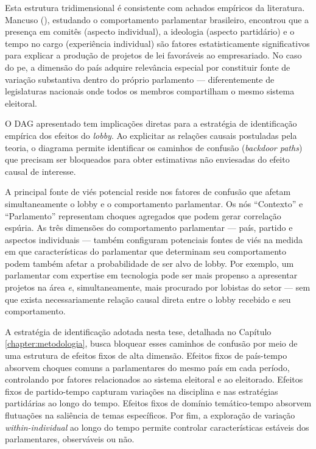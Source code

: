 Esta estrutura tridimensional é consistente com achados empíricos da literatura. Mancuso (\citeyear{mancuso2023business}), estudando o comportamento parlamentar brasileiro, encontrou que a presença em comitês (aspecto individual), a ideologia (aspecto partidário) e o tempo no cargo (experiência individual) são fatores estatisticamente significativos para explicar a produção de projetos de lei favoráveis ao empresariado. No caso do \acrshort{pe}, a dimensão do país adquire relevância especial por constituir fonte de variação substantiva dentro do próprio parlamento — diferentemente de legislaturas nacionais onde todos os membros compartilham o mesmo sistema eleitoral.

O DAG apresentado tem implicações diretas para a estratégia de identificação empírica dos efeitos do \textit{lobby}. Ao explicitar as relações causais postuladas pela teoria, o diagrama permite identificar os caminhos de confusão (\textit{backdoor paths}) que precisam ser bloqueados para obter estimativas não enviesadas do efeito causal de interesse.

A principal fonte de viés potencial reside nos fatores de confusão que afetam simultaneamente o lobby e o comportamento parlamentar. Os nós ``Contexto'' e ``Parlamento'' representam choques agregados que podem gerar correlação espúria. As três dimensões do comportamento parlamentar — país, partido e aspectos individuais — também configuram potenciais fontes de viés na medida em que características do parlamentar que determinam seu comportamento podem também afetar a probabilidade de ser alvo de lobby. Por exemplo, um parlamentar com expertise em tecnologia pode ser mais propenso a apresentar projetos na área \textit{e}, simultaneamente, mais procurado por lobistas do setor — sem que exista necessariamente relação causal direta entre o lobby recebido e seu comportamento.

A estratégia de identificação adotada nesta tese, detalhada no Capítulo \ref{chapter:metodologia}, busca bloquear esses caminhos de confusão por meio de uma estrutura de efeitos fixos de alta dimensão. Efeitos fixos de país-tempo absorvem choques comuns a parlamentares do mesmo país em cada período, controlando por fatores relacionados ao sistema eleitoral e ao eleitorado. Efeitos fixos de partido-tempo capturam variações na disciplina e nas estratégias partidárias ao longo do tempo. Efeitos fixos de domínio temático-tempo absorvem flutuações na saliência de temas específicos. Por fim, a exploração de variação \textit{within-individual} ao longo do tempo permite controlar características estáveis dos parlamentares, observáveis ou não.

